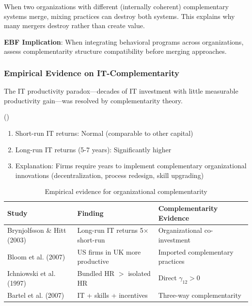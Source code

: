 \begin{proposition}
\label{prop:fragility}
When two organizations with different (internally coherent) complementary systems 
merge, mixing practices can destroy both systems. This explains why many mergers 
destroy rather than create value.
\end{proposition}

\textbf{EBF Implication}: When integrating behavioral programs across 
organizations, assess complementarity structure compatibility before merging 
approaches.

\subsubsection{Empirical Evidence on IT-Complementarity}

The IT productivity paradox---decades of IT investment with little measurable 
productivity gain---was resolved by complementarity theory.

\begin{theorem}
\label{thm:it-paradox}
\textup{(\citet{brynjolfsson2003computing})}
\begin{enumerate}
    \item Short-run IT returns: Normal (comparable to other capital)
    \item Long-run IT returns (5-7 years): Significantly higher
    \item Explanation: Firms require years to implement complementary organizational 
    innovations (decentralization, process redesign, skill upgrading)
\end{enumerate}
\end{theorem}

\begin{table}[h]
\centering
\small
\begin{tabular}{p{4cm}p{4cm}p{4cm}}
\toprule
\textbf{Study} & \textbf{Finding} & \textbf{Complementarity Evidence} \\
\midrule
Brynjolfsson \& Hitt (2003) & Long-run IT returns 5$\times$ short-run & Organizational co-investment \\
Bloom et al. (2007) & US firms in UK more productive & Imported complementary practices \\
Ichniowski et al. (1997) & Bundled HR $>$ isolated HR & Direct $\gamma_{12} > 0$ \\
Bartel et al. (2007) & IT + skills + incentives & Three-way complementarity \\
\bottomrule
\end{tabular}
\caption{Empirical evidence for organizational complementarity}
\label{tab:empirical-evidence}
\end{table}

